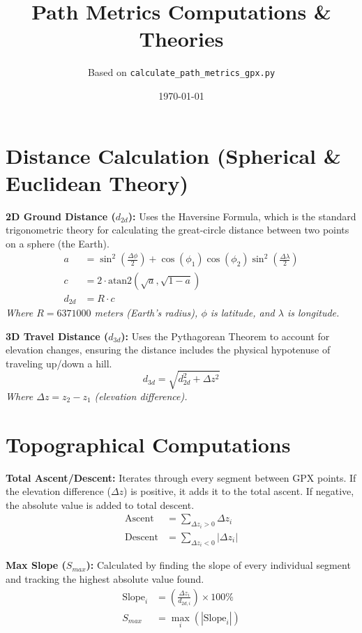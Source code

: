 \documentclass[12pt, a4paper]{article}
\title{Path Metrics Computations \& Theories}
\author{Based on \texttt{calculate\_path\_metrics\_gpx.py}}
\date{\today}
\begin{document}
\maketitle

\section{Distance Calculation (Spherical \& Euclidean Theory)}

\textbf{2D Ground Distance ($d_{2d}$):} Uses the Haversine Formula, which is the standard trigonometric theory for calculating the great-circle distance between two points on a sphere (the Earth).
\begin{align}
    a &= \sin^2\left(\frac{\Delta\phi}{2}\right) + \cos(\phi_1)\cos(\phi_2)\sin^2\left(\frac{\Delta\lambda}{2}\right) \\
    c &= 2 \cdot \text{atan2}\left(\sqrt{a}, \sqrt{1-a}\right) \\
    d_{2d} &= R \cdot c
\end{align}
\textit{Where $R = 6371000$ meters (Earth's radius), $\phi$ is latitude, and $\lambda$ is longitude.}

\vspace{1em}
\textbf{3D Travel Distance ($d_{3d}$):} Uses the Pythagorean Theorem to account for elevation changes, ensuring the distance includes the physical hypotenuse of traveling up/down a hill.
\begin{equation}
    d_{3d} = \sqrt{d_{2d}^2 + \Delta z^2}
\end{equation}
\textit{Where $\Delta z = z_2 - z_1$ (elevation difference).}

\section{Topographical Computations}

\textbf{Total Ascent/Descent:} Iterates through every segment between GPX points. If the elevation difference ($\Delta z$) is positive, it adds it to the total ascent. If negative, the absolute value is added to total descent.
\begin{align}
    \text{Ascent} &= \sum_{\Delta z_i > 0} \Delta z_i \\
    \text{Descent} &= \sum_{\Delta z_i < 0} |\Delta z_i|
\end{align}

\textbf{Max Slope ($S_{max}$):} Calculated by finding the slope of every individual segment and tracking the highest absolute value found.
\begin{align}
    \text{Slope}_i &= \left( \frac{\Delta z_i}{d_{2d,i}} \right) \times 100\% \\
    S_{max} &= \max_i (|\text{Slope}_i|)
\end{align}
\end{document}
